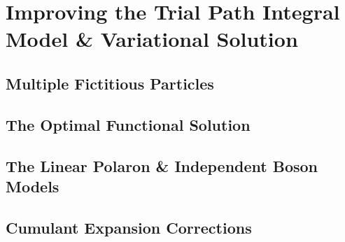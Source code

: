 \chapter{Improving the Trial Path Integral Model \& Variational Solution}
\label{chap:fourth}



\section{Multiple Fictitious Particles}
\label{sec:chap-fourth-first}

\section{The Optimal Functional Solution}
\label{sec:chap-fourth-second}

\section{The Linear Polaron \& Independent Boson Models}
\label{sec:chap-fourth-third}

\section{Cumulant Expansion Corrections}
\label{sec:chap-fourth-fourth}